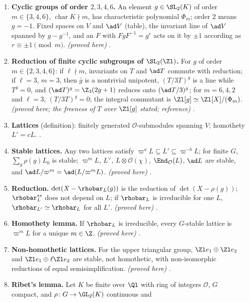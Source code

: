 \begin{enumerate}[label=\textbf{\thechapter.\arabic*}]
field iff $\det(X-x)$ is irreducible. \emph{(proved here)} .
\item \textbf{Cyclic groups of order $2,3,4,6$.} An element $g\in\SL_2(K)$ of order $m\in\{3,4,6\}$, $\operatorname{char}K\nmid m$, has characteristic
polynomial $\Phi_m$; order $2$ means $g=-1$. Fixed spaces on $V$ and $\ad V$ (table), the invariant line of $\ad V$ spanned by $g-g^{-1}$,
and an $F$ with $FgF^{-1}=g^r$ acts on it by $\pm1$ according as $r\equiv\pm1\pmod m$. \emph{(proved here)} .
\item \textbf{Reduction of finite cyclic subgroups of $\SL_2(\Zl)$.} For $g$ of order $m\in\{2,3,4,6\}$: if $\ell\nmid m$, invariants on $T$ and
$\ad T$ commute with reduction; if $\ell=3$, $m=3$, then $\bar g$ is a nontrivial unipotent, $(T/3T)^g$ is a line while $T^g=0$, and
$(\ad T)^g=\Z_3(2g+1)$ reduces onto $(\ad T/3)^g$; for $m=6,4,2$ and $\ell=3$, $(T/3T)^g=0$; the integral commutant is $\Zl[g]\simeq\Zl[X]/(\Phi_m)$.
\emph{(proved here; the freeness of $T$ over $\Zl[g]$ stated; reference)} .
\item \textbf{Lattices} (definition): finitely generated $\mathcal{O}$-submodules spanning $V$; homothety $L'=cL$. .
\item \textbf{Stable lattices.} Any two lattices satisfy $\varpi^aL\subseteq L'\subseteq\varpi^{-b}L$; for finite $G$, $\sum_g\rho(g)L_0$ is stable; $\varpi^mL$,
$L^\vee$, $L\otimes\mathcal{O}(\chi)$, $\End_\mathcal{O}(L)$, $\ad L$ are stable, and $\ad L/\varpi^m=\ad(L/\varpi^mL)$. \emph{(proved here)} .
\item \textbf{Reduction.} $\det(X-\rhobar_L(g))$ is the reduction of $\det(X-\rho(g))$; $\rhobar_L^{ss}$ does not depend on $L$; if $\rhobar_L$ is
irreducible for one $L$, $\rhobar_{L'}\simeq\rhobar_L$ for all $L'$. \emph{(proved here)} .
\item \textbf{Homothety lemma.} If $\rhobar_L$ is irreducible, every $G$-stable lattice is $\varpi^mL$ for a unique $m\in\Z$. \emph{(proved here)}
.
\item \textbf{Non-homothetic lattices.} For the upper triangular group, $\Zl e_1\oplus\Zl e_2$ and $\Zl e_1\oplus\ell\Zl e_2$ are stable, not homothetic,
with non-isomorphic reductions of equal semisimplification. \emph{(proved here)} .
\item \textbf{Ribet's lemma.} Let $K$ be finite over $\Ql$ with ring of integers $\mathcal{O}$, $G$ compact, and $\rho\colon G\to\GL_2(K)$ continuous and

\end{enumerate}
